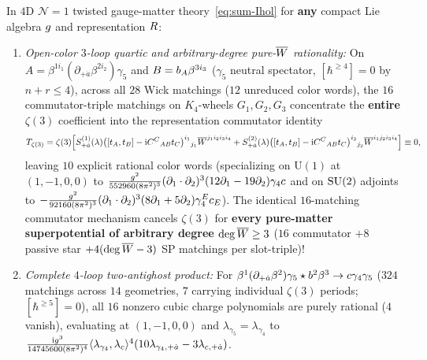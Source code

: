 \begin{theorem}
\label{thm:universal-quartic}
In $4\mathrm{D}$ $\mathcal{N}=1$ twisted gauge-matter theory~\eqref{eq:sum-Ihol} for \textbf{any} compact Lie algebra $g$ and representation $R$:
\begin{enumerate}[label=(\arabic*),leftmargin=*]
  \item \emph{Open-color $3$-loop quartic and arbitrary-degree pure-$\overline{W}$ rationality:} On $A = \beta^{1 i_1}(\partial_{+\dot{a}}\beta^{2 i_2})\gamma_5$ and $B = b_A\beta^{3 i_3}$ ($\gamma_5$ neutral spectator, $[\hbar^{\ge 4}] = 0$ by $n+r \le 4$), across all $28$ Wick matchings ($12$ unreduced color words), the $16$ commutator-triple matchings on $K_4$-wheels $G_1,G_2,G_3$ concentrate the \textbf{entire} $\zeta(3)$ coefficient into the representation commutator identity
  \begin{equation}
  \label{eq:universal-commutator-zeta3}
  T_{\zeta(3)} = \zeta(3)\Bigl[S^{(1)}_{+\dot{a}}(\lambda)\bigl([t_A,t_B] - \mathrm{i} C^C{}_{AB}t_C\bigr)^{i_1}{}_{j_1}\overline{W}^{j_1 i_2 i_3 i_4} + S^{(2)}_{+\dot{a}}(\lambda)\bigl([t_A,t_B] - \mathrm{i} C^C{}_{AB}t_C\bigr)^{i_2}{}_{j_2}\overline{W}^{i_1 j_2 i_3 i_4}\Bigr] \equiv 0,
  \end{equation}
  leaving $10$ explicit rational color words (specializing on $\mathrm{U}(1)$ at $(1,-1,0,0)$ to $\frac{g^2}{552960(8\pi^2)^3}(\partial_1\cdot\partial_2)^3(12\partial_1-19\partial_2)\gamma_4c$ and on $\operatorname{SU}(2)$ adjoints to $-\frac{g^2}{92160(8\pi^2)^3}(\partial_1\cdot\partial_2)^3(8\partial_1+5\partial_2)\gamma_4^Ec_E$). The identical $16$-matching commutator mechanism cancels $\zeta(3)$ for \textbf{every pure-matter superpotential of arbitrary degree $\deg\overline{W} \ge 3$} ($16$ commutator $+ 8$ passive star $+ 4(\deg\overline{W}-3)$ SP matchings per slot-triple)!

  \item \emph{Complete $4$-loop two-antighost product:} For $\beta^1(\partial_{+\dot{a}}\beta^2)\gamma_5 \star b^2\beta^3 \to c\gamma_4\gamma_5$ ($324$ matchings across $14$ geometries, $7$ carrying individual $\zeta(3)$ periods; $[\hbar^{\ge 5}]=0$), all $16$ nonzero cubic charge polynomials are purely rational ($4$ vanish), evaluating at $(1,-1,0,0)$ and $\lambda_{\gamma_5}=\lambda_{\gamma_4}$ to $\frac{\mathrm{i} g^3}{14745600(8\pi^2)^4}\langle\lambda_{\gamma_4},\lambda_{c}\rangle^4(10\lambda_{\gamma_4,+\dot{a}} - 3\lambda_{c,+\dot{a}})$.
\end{enumerate}
\end{theorem}


